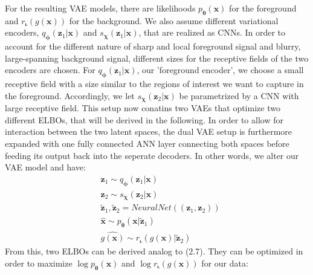 \documentclass[12pt]{report}
\theoremstyle{definition}
\begin{document}
For the resulting VAE models, there are likelihoods $p_{\pmb{\theta}}(\mathbf{x})$ for the foreground and $r_{\mathbf{\iota}}(g(\mathbf{x}))$ for the background. We also assume different variational encoders, $q_{\pmb{\phi}}(\mathbf{z}_1|\mathbf{x})$ and $s_{\mathbf{\chi}}(\mathbf{z}_1|\mathbf{x})$, that are realized as CNNs. In order to account for the different nature of sharp and local foreground signal and blurry, large-spanning background signal, different sizes for the receptive fields of the two encoders are chosen. For $q_{\pmb{\phi}}(\mathbf{z}_1|\mathbf{x})$, our 'foreground encoder', we choose a small receptive field with a size similar to the regions of interest we want to capture in the foreground. Accordingly, we let $s_{\mathbf{\chi}}(\mathbf{z}_2|\mathbf{x})$ be parametrized by a CNN with large receptive field. This setup now conatins two VAEs that optimize two different ELBOs, that will be derived in the following. In order to allow for interaction between the two latent spaces, the dual VAE setup is furthermore expanded with one fully connected ANN layer connecting both spaces before feeding its output back into the seperate decoders. In other words, we alter our VAE model and have:
\begin{equation}
\begin{split}
& \mathbf{z}_1 \sim q_{\pmb{\phi}}(\mathbf{z}_1|\mathbf{x}) \\
& \mathbf{z}_2 \sim s_{\mathbf{\chi}}(\mathbf{z}_2|\mathbf{x}) \\
& \tilde{\mathbf{z}}_1, \tilde{\mathbf{z}}_2 = NeuralNet((\mathbf{z}_1, \mathbf{z}_2)) \\
& \hat{\mathbf{x}} \sim p_{\pmb{\theta}}(\mathbf{x}|\tilde{\mathbf{z}}_1) \\
& \hat{g(\mathbf{x})} \sim r_{\mathbf{\iota}}(g(\mathbf{x})|\tilde{\mathbf{z}}_2)
\end{split}
\end{equation}
From this, two ELBOs can be derived analog to (2.7). They can be optimized in order to maximize $\log p_{\pmb{\theta}}(\mathbf{x})$ and $\log r_{\mathbf{\iota}}(g(\mathbf{x}))$ for our data:
\end{document}
